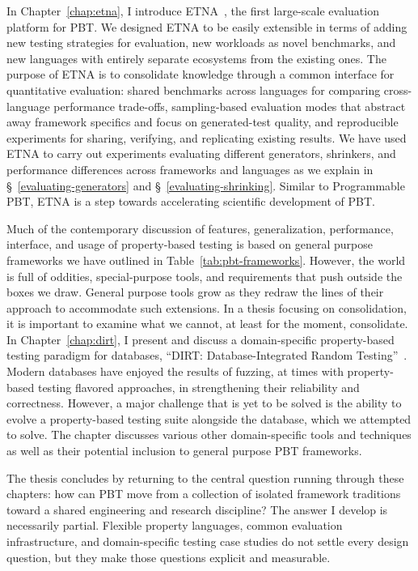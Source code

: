 In Chapter~\ref{chap:etna}, I introduce ETNA~\cite{ETNA}, the first large-scale
evaluation platform for PBT. We designed ETNA to be easily extensible in terms of
adding new testing strategies for evaluation, new workloads as novel benchmarks, and
new languages with entirely separate ecosystems from the existing ones. The purpose of
ETNA is to consolidate knowledge through a common interface for quantitative
evaluation: shared benchmarks across languages for comparing cross-language performance
trade-offs, sampling-based evaluation modes that abstract away framework specifics and
focus on generated-test quality, and reproducible experiments for sharing, verifying,
and replicating existing results. We have used ETNA to carry out experiments evaluating
different generators, shrinkers, and performance differences across frameworks and
languages as we explain in \S~\ref{evaluating-generators} and
\S~\ref{evaluating-shrinking}. Similar to Programmable PBT, ETNA is a step towards
accelerating scientific development of PBT.

Much of the contemporary discussion of features, generalization, performance,
interface, and usage of property-based testing is based on general purpose frameworks
we have outlined in Table~\ref{tab:pbt-frameworks}. However, the world is full of
oddities, special-purpose tools, and requirements that push outside the boxes we draw.
General purpose tools grow as they redraw the lines of their approach to accommodate
such extensions. In a thesis focusing on consolidation, it is important to examine what
we cannot, at least for the moment, consolidate. In Chapter~\ref{chap:dirt}, I present
and discuss a domain-specific property-based testing paradigm for databases, ``DIRT:
Database-Integrated Random Testing''~\cite{dirt-dbtest26}. Modern databases have
enjoyed the results of fuzzing, at times with property-based testing flavored
approaches, in strengthening their reliability and correctness. However, a major
challenge that is yet to be solved is the ability to evolve a property-based testing
suite alongside the database, which we attempted to solve. The chapter discusses
various other domain-specific tools and techniques as well as their potential inclusion
to general purpose PBT frameworks.

The thesis concludes by returning to the central question running through these
chapters: how can PBT move from a collection of isolated framework traditions toward a
shared engineering and research discipline? The answer I develop is necessarily
partial. Flexible property languages, common evaluation infrastructure, and
domain-specific testing case studies do not settle every design question, but they make
those questions explicit and measurable.

